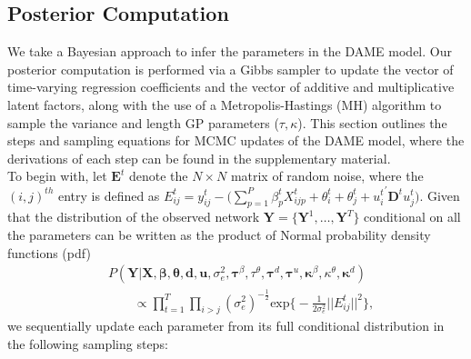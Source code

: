 \documentclass[a4paper]{article}
\begin{document}
\subsection{Posterior Computation}\label{subsec: posterior computation}
We take a Bayesian approach to infer the parameters in the DAME model. Our posterior computation is performed via a Gibbs sampler to update the vector of time-varying regression coefficients and the vector of additive and multiplicative latent factors, along with the use of a Metropolis-Hastings (MH) algorithm to sample the variance and length GP parameters ($\tau, \kappa$). This section outlines the steps and sampling equations for MCMC updates of the DAME model, where the derivations of each step can be found in the supplementary material.\\ \newline
To begin with, let $\mathbf{E}^t$ denote the $N \times N$ matrix of random noise, where the $(i, j)^{th}$ entry is defined as $E^t_{ij} = y^t_{ij}-\big(\sum\limits_{p=1}^P \beta^t_{p}X^t_{ijp}+\theta^t_{i}+\theta^t_{j}+{u^t_{i}}^\prime \mathbf{D}^tu^t_{j}\big)$. Given that the distribution of the observed network $\mathbf{Y}= \{\mathbf{Y}^1,\ldots,\mathbf{Y}^T\}$ conditional on all the parameters can be written as the product of Normal probability density functions (pdf)
\begin{equation}
\begin{aligned}
	&P(\mathbf{Y}|\mathbf{X}, \boldsymbol{\beta}, \boldsymbol{\theta}, \boldsymbol{d}, \boldsymbol{u},\sigma_e^2, \boldsymbol\tau^{\beta}, \tau^{\theta}, \boldsymbol\tau^{d}, \boldsymbol\tau^{u}, \boldsymbol\kappa^\beta, \kappa^\theta, \boldsymbol\kappa^d)\\&\quad\quad\propto  \prod_{t=1}^T\prod_{i>j}(\sigma_e^2)^{-\frac{1}{2}}\mbox{exp}\Big\{-\frac{1}{2\sigma_e^2}||E^t_{ij}||^2\Big\},
	\end{aligned}
\end{equation}
we sequentially update each parameter from its full conditional distribution in the following sampling steps:
\end{document}

